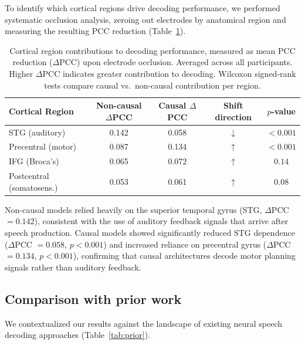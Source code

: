 \documentclass[11pt]{article}
\begin{document}
To identify which cortical regions drive decoding performance, we performed systematic occlusion analysis, zeroing out electrodes by anatomical region and measuring the resulting PCC reduction (Table~\ref{tab:occlusion}).

\begin{table}[H]
\centering
\caption{Cortical region contributions to decoding performance, measured as mean PCC reduction ($\Delta$PCC) upon electrode occlusion. Averaged across all participants. Higher $\Delta$PCC indicates greater contribution to decoding. Wilcoxon signed-rank tests compare causal vs.\ non-causal contribution per region.}
\label{tab:occlusion}
\begin{tabular}{lcccc}
\toprule
\textbf{Cortical Region} & \textbf{Non-causal $\Delta$PCC} & \textbf{Causal $\Delta$PCC} & \textbf{Shift direction} & \textbf{$p$-value} \\
\midrule
STG (auditory) & 0.142 & 0.058 & $\downarrow$ & $< 0.001$ \\
Precentral (motor) & 0.087 & 0.134 & $\uparrow$ & $< 0.001$ \\
IFG (Broca's) & 0.065 & 0.072 & $\uparrow$ & $0.14$ \\
Postcentral (somatosens.) & 0.053 & 0.061 & $\uparrow$ & $0.08$ \\
\bottomrule
\end{tabular}
\end{table}

Non-causal models relied heavily on the superior temporal gyrus (STG, $\Delta$PCC $= 0.142$), consistent with the use of auditory feedback signals that arrive after speech production. Causal models showed significantly reduced STG dependence ($\Delta$PCC $= 0.058$, $p < 0.001$) and increased reliance on precentral gyrus ($\Delta$PCC $= 0.134$, $p < 0.001$), confirming that causal architectures decode motor planning signals rather than auditory feedback.

\subsection{Comparison with prior work}

We contextualized our results against the landscape of existing neural speech decoding approaches (Table~\ref{tab:prior}).
\end{document}
